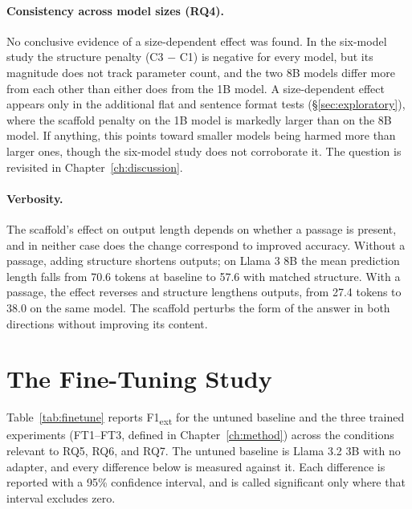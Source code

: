 \documentclass[master]{thesis}
\newcommand{\cref}[1]{Chapter~\ref{#1}}  %
\begin{document}
\paragraph{Consistency across model sizes (RQ4).}
No conclusive evidence of a size-dependent effect was found. In the six-model study the structure penalty (C3 $-$ C1) is negative for every model, but its magnitude does not track parameter count, and the two 8B models differ more from each other than either does from the 1B model. A size-dependent effect appears only in the additional flat and sentence format tests (\S\ref{sec:exploratory}), where the scaffold penalty on the 1B model is markedly larger than on the 8B model. If anything, this points toward smaller models being harmed more than larger ones, though the six-model study does not corroborate it. The question is revisited in \cref{ch:discussion}.

\paragraph{Verbosity.}
The scaffold's effect on output length depends on whether a passage is present, and in neither case does the change correspond to improved accuracy. Without a passage, adding structure shortens outputs; on Llama 3 8B the mean prediction length falls from 70.6 tokens at baseline to 57.6 with matched structure. With a passage, the effect reverses and structure lengthens outputs, from 27.4 tokens to 38.0 on the same model. The scaffold perturbs the form of the answer in both directions without improving its content.

\section{The Fine-Tuning Study}

Table~\ref{tab:finetune} reports F1\textsubscript{ext} for the untuned baseline and the three trained experiments (FT1--FT3, defined in \cref{ch:method}) across the conditions relevant to RQ5, RQ6, and RQ7. The untuned baseline is Llama 3.2 3B with no adapter, and every difference below is measured against it. Each difference is reported with a 95\% confidence interval, and is called significant only where that interval excludes zero.
\end{document}

